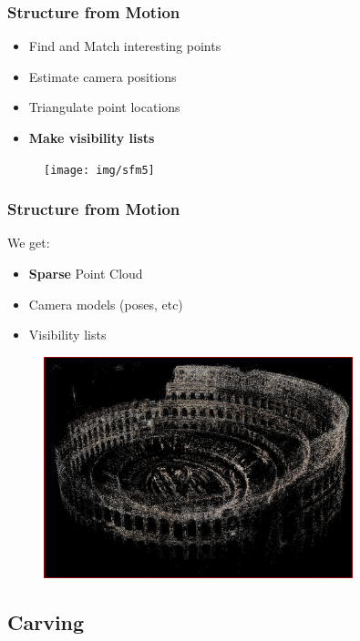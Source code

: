 \documentclass{beamer}
\begin{document}
\begin{frame}
  \frametitle{Structure from Motion}
  \begin{itemize}
    \item Find and Match interesting points
    \item Estimate camera positions
    \item Triangulate point locations
    \item \textbf{Make visibility lists}
  \end{itemize}
  \begin{figure}[htb!]
   \centering
   \texttt{[image: img/sfm5]}
  \end{figure}
\end{frame}

\begin{frame}
  \frametitle{Structure from Motion}
  We get:
  \begin{itemize}
    \item \textbf{Sparse} Point Cloud
    \item Camera models (poses, etc)
    \item Visibility lists
  \end{itemize}
  \begin{figure}[htb!]
   \centering
   \includegraphics[width=0.8\textwidth]{img/sfm_sparsepointcloud}
  \end{figure}
\end{frame}


\subsection{Carving}
\end{document}
